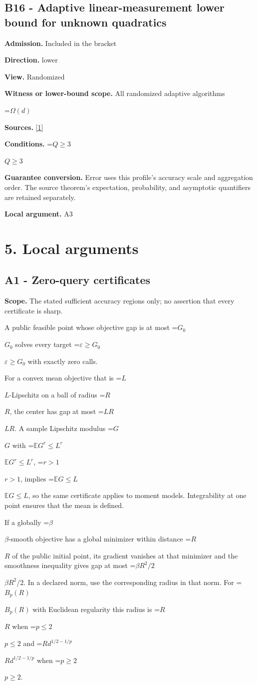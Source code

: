 \documentclass[10pt,a4paper]{article}
\newcommand{\AtlasMath}[1]{\par\begingroup\centering\setbox0=\hbox{$\displaystyle #1$}\ifdim\wd0>1.4\linewidth\typeout{ATLAS WIDE FORMULA: \the\wd0}\fi\ifdim\wd0>\linewidth\resizebox{\linewidth}{!}{\box0}\else\box0\fi\par\endgroup}
\newcommand{\AtlasInlineMath}[1]{\begingroup\setbox0=\hbox{$#1$}\ifdim\wd0>.4\linewidth\endgroup\AtlasMath{#1}\else\endgroup$#1$\fi}
\begin{document}
\subsection{B16 - Adaptive linear-measurement lower bound for unknown quadratics}
\textbf{Admission.} Included in the bracket

\textbf{Direction.} lower

\textbf{View.} Randomized

\textbf{Witness or lower-bound scope.} All randomized adaptive algorithms

\AtlasMath{\Omega(d)}
\textbf{Sources.} \href{https://arxiv.org/html/2610.00345v1}{[1]}

\textbf{Conditions.} \AtlasInlineMath{Q\ge 3}

\textbf{Guarantee conversion.} Error uses this profile's accuracy scale and aggregation order. The source theorem's expectation, probability, and asymptotic quantifiers are retained separately.

\textbf{Local argument.} A3

\section{5. Local arguments}
\subsection{A1 - Zero-query certificates}
\textbf{Scope.} The stated sufficient accuracy regions only; no assertion that every certificate is sharp.

A public feasible point whose objective gap is at most \AtlasInlineMath{G_0} solves every target \AtlasInlineMath{\varepsilon\ge G_0} with exactly zero calls.

For a convex mean objective that is \AtlasInlineMath{L}-Lipschitz on a ball of radius \AtlasInlineMath{R}, the center has gap at most \AtlasInlineMath{LR}. A sample Lipschitz modulus \AtlasInlineMath{G} with \AtlasInlineMath{\mathbb E G^r\le L^r}, \AtlasInlineMath{r>1}, implies \AtlasInlineMath{\mathbb E G\le L}, so the same certificate applies to moment models. Integrability at one point ensures that the mean is defined.

If a globally \AtlasInlineMath{\beta}-smooth objective has a global minimizer within distance \AtlasInlineMath{R} of the public initial point, its gradient vanishes at that minimizer and the smoothness inequality gives gap at most \AtlasInlineMath{\beta R^2/2}. In a declared norm, use the corresponding radius in that norm. For \AtlasInlineMath{B_p(R)} with Euclidean regularity this radius is \AtlasInlineMath{R} when \AtlasInlineMath{p\le2} and \AtlasInlineMath{R d^{1/2-1/p}} when \AtlasInlineMath{p\ge2}.
\end{document}
